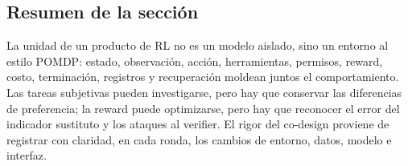 \subsection{Resumen de la sección}

La unidad de un producto de RL no es un modelo aislado, sino un entorno al estilo POMDP: estado, observación, acción, herramientas, permisos, reward, costo, terminación, registros y recuperación moldean juntos el comportamiento. Las tareas subjetivas pueden investigarse, pero hay que conservar las diferencias de preferencia; la reward puede optimizarse, pero hay que reconocer el error del indicador sustituto y los ataques al verifier. El rigor del co-design proviene de registrar con claridad, en cada ronda, los cambios de entorno, datos, modelo e interfaz.
